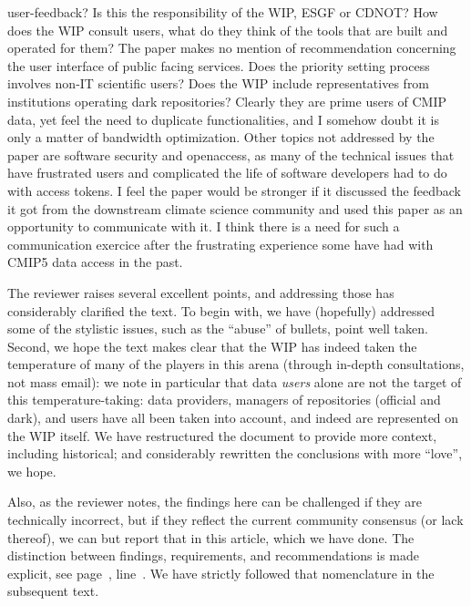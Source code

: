 \documentclass[gmd,manuscript]{copernicus}
\newcommand{\plref}[1]{see page~\pageref{p-#1}, line~\lineref{l-#1}.}
\newenvironment{answer}{\color{blue}}{}
\begin{document}
\begin{enumerate}[label=RC2-\arabic*,leftmargin=*]
  user-feedback? Is this the responsibility of the WIP, ESGF or CDNOT?
  How does the WIP consult users, what do they think of the tools that
  are built and operated for them? The paper makes no mention of
  recommendation concerning the user interface of public facing
  services. Does the priority setting process involves non-IT
  scientific users? Does the WIP include representatives from
  institutions operating dark repositories? Clearly they are prime
  users of CMIP data, yet feel the need to duplicate functionalities,
  and I somehow doubt it is only a matter of bandwidth optimization.
  Other topics not addressed by the paper are software security and
  openaccess, as many of the technical issues that have frustrated
  users and complicated the life of software developers had to do with
  access tokens. I feel the paper would be stronger if it discussed
  the feedback it got from the downstream climate science community
  and used this paper as an opportunity to communicate with it. I
  think there is a need for such a communication exercice after the
  frustrating experience some have had with CMIP5 data access in the
  past.

  \begin{answer}
    The reviewer raises several excellent points, and addressing those
    has considerably clarified the text. To begin with, we have
    (hopefully) addressed some of the stylistic issues, such as the
    ``abuse'' of bullets, point well taken. Second, we hope the text
    makes clear that the WIP has indeed taken the temperature of many
    of the players in this arena (through in-depth consultations, not
    mass email): we note in particular that data \emph{users} alone
    are not the target of this temperature-taking: data providers,
    managers of repositories (official and dark), and users have all
    been taken into account, and indeed are represented on the WIP
    itself. We have restructured the document to provide more context,
    including historical; and considerably rewritten the conclusions
    with more ``love'', we hope.

    Also, as the reviewer notes, the findings here can be challenged
    if they are technically incorrect, but if they reflect the current
    community consensus (or lack thereof), we can but report that in
    this article, which we have done. The distinction between
    findings, requirements, and recommendations is made explicit,
    \plref{RC1-Overview-2} We have strictly followed that nomenclature
    in the subsequent text.
  \end{answer}


\end{enumerate}
\end{document}
